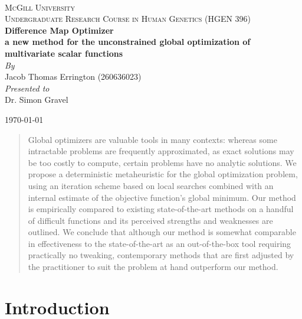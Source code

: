 \documentclass[12pt]{article}
\begin{document}
\begin{titlepage}
    \begin{center}
        ~\\[2.0cm]

        \textsc{
            \LARGE McGill University
        }\\[1.5cm]

        \textsc{
            \Large Undergraduate Research Course in Human Genetics (HGEN 396)
        }\\[1.0cm]

        {
            \huge \bfseries Difference Map Optimizer \\
            a new method for the unconstrained global optimization of
            multivariate scalar functions
        }\\[2.0cm]

        \emph{By}\\
        Jacob Thomas Errington (260636023)\\[1.0cm]

        \emph{Presented to}\\
        Dr. Simon Gravel

        \vfill

        \today
    \end{center}
\end{titlepage}

\begin{abstract}

Global optimizers are valuable tools in many contexts:
whereas some intractable problems are frequently approximated, as exact
solutions may be too costly to compute, certain problems have no analytic
solutions.
We propose a deterministic metaheuristic for the global optimization
problem, using an iteration scheme based on local searches combined with an
internal estimate of the objective function's global minimum.
Our method is empirically compared to existing state-of-the-art methods on
a handful of difficult functions and its perceived strengths and weaknesses
are outlined.
We conclude that although our method is somewhat comparable in effectiveness to
the state-of-the-art as an out-of-the-box tool requiring practically no
tweaking, contemporary methods that are first adjusted by
the practitioner to suit the problem at hand outperform our method.

\end{abstract}

\section{Introduction}
\end{document}
